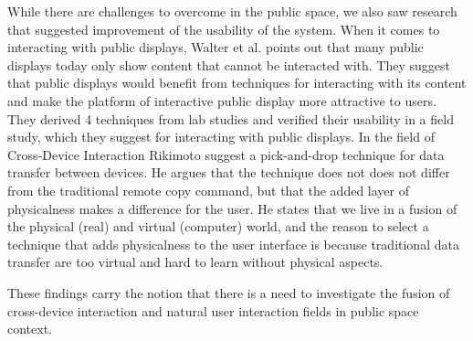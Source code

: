 While there are challenges to overcome in the public space, we also saw research that suggested improvement of the usability of the system. When it comes to interacting with public displays, Walter et al. \protect\cite{Walter:2014} points out that many public displays today only show content that cannot be interacted with. They suggest that public displays would benefit from techniques for interacting with its content and make the platform of interactive public display more attractive to users. They derived 4 techniques from lab studies and verified their usability in a field study, which they suggest for interacting with public displays. 
In the field of Cross-Device Interaction Rikimoto \protect\cite{Rekimoto:1997} suggest a pick-and-drop technique for data transfer between devices. He argues that the technique does not does not differ from the traditional remote copy command, but that the added layer of physicalness makes a difference for the user. He states that we live in a fusion of the physical (real) and virtual (computer) world, and the reason to select a technique that adds physicalness to the user interface is because traditional data transfer are too virtual and hard to learn without physical aspects.

 These findings carry the notion that there is a need to investigate the fusion of cross-device interaction and natural user interaction fields in public space context. %

